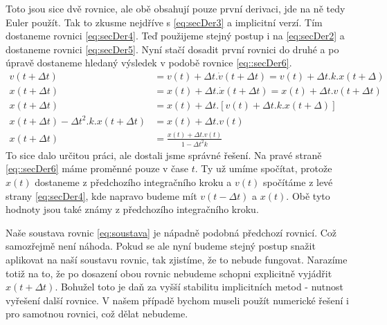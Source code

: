 Toto jsou sice dvě rovnice, ale obě obsahují pouze první derivaci, jde na ně tedy Euler použít. Tak to zkusme nejdříve s \eqref{eq:secDer3} a implicitní verzí. Tím dostaneme rovnici \eqref{eq:secDer4}. Teď použijeme stejný postup i na \eqref{eq:secDer2} a dostaneme rovnici \eqref{eq:secDer5}. Nyní stačí dosadit první rovnici do druhé a po úpravě dostaneme hledaný výsledek v podobě rovnice \eqref{eq::secDer6}.
\begin{align}
\label{eq:secDer4}
 v(t + \Delta t)&=v(t) + \Delta t . \dot{v}(t + \Delta t)  
 =  v(t) + \Delta t . k.x(t + \Delta)\\
 \label{eq:secDer5}
 x(t+\Delta t) &= x(t) + \Delta t. \dot{x}(t+ \Delta t) = x(t) + \Delta t.v(t+ \Delta t) \\
 \label{eq::secDer6}
 x(t+\Delta t) &= x(t) + \Delta t. \left[ v(t) + \Delta t . k.x(t + \Delta)\right]  \nonumber\\
 x(t+\Delta t) - \Delta t^2 .k.x(t+\Delta t) &=x(t) + \Delta t.  v(t) \nonumber\\
  x(t+\Delta t) &= \frac{x(t) + \Delta t.  v(t)}{1 - \Delta t^2 k}
\end{align}
To sice dalo určitou práci, ale dostali jsme správné řešení. Na pravé straně \eqref{eq::secDer6} máme proměnné pouze v čase $ t $. Ty už umíme spočítat, protože $ x(t) $ dostaneme z předchozího integračního kroku a $ v(t) $ spočítáme z levé strany \eqref{eq:secDer4}, kde napravo budeme mít  $ v(t-\Delta t) $ a $ x(t) $. Obě tyto hodnoty jsou také známy z předchozího integračního kroku.

Naše soustava rovnic \eqref{eq:soustava} je nápadně podobná předchozí rovnicí. Což samozřejmě není náhoda. Pokud se ale nyní budeme stejný postup snažit aplikovat na naší soustavu rovnic, tak zjistíme, že to nebude fungovat. Narazíme totiž na to, že po dosazení obou rovnic nebudeme schopni explicitně vyjádřit $ x(t + \Delta t) $. Bohužel toto je daň za vyšší stabilitu implicitních metod - nutnost vyřešení další rovnice. V našem případě bychom museli použít numerické řešení i pro samotnou rovnici, což dělat nebudeme.

